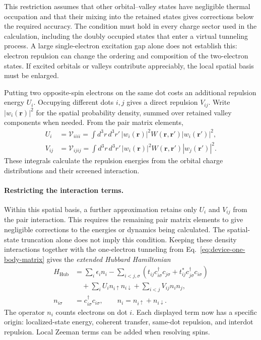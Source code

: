 This restriction assumes that other orbital--valley states have
negligible thermal occupation and that their mixing into the retained
states gives corrections below the required accuracy. The condition
must hold in every charge sector used in the calculation, including
the doubly occupied states that enter a virtual tunneling process.
A large single-electron excitation gap alone does not establish this:
electron repulsion can change the ordering and composition of the
two-electron states. If excited orbitals or valleys contribute
appreciably, the local spatial basis must be enlarged.

Putting two opposite-spin electrons on the same dot costs an
additional repulsion energy $U_i$. Occupying different dots $i,j$
gives a direct repulsion $V_{ij}$. Write $|w_i(\mathbf r)|^2$
for the spatial probability density, summed over retained valley
components when needed. From the pair matrix elements,
\begin{equation}
 \begin{aligned}
 U_i&=\mathcal V_{iiii}
   =\int d^3r\,d^3r'\,
       |w_i(\mathbf r)|^2W(\mathbf r,\mathbf r')
                         |w_i(\mathbf r')|^2,\\
 V_{ij}&=\mathcal V_{ijij}
   =\int d^3r\,d^3r'\,
       |w_i(\mathbf r)|^2W(\mathbf r,\mathbf r')
                         |w_j(\mathbf r')|^2.
 \end{aligned}
 \label{eq:device-density-interactions}
\end{equation}
These integrals calculate the repulsion energies from the
orbital charge distributions and their screened interaction.

\paragraph{Restricting the interaction terms.}
Within this spatial basis, a further approximation retains only
$U_i$ and $V_{ij}$ from the pair interaction. This requires the
remaining pair matrix elements to give negligible corrections to
the energies or dynamics being calculated. The spatial-state
truncation alone does not imply this condition.
Keeping these density interactions together with the one-electron
tunneling from Eq.~\eqref{eq:device-one-body-matrix} gives the
\emph{extended Hubbard Hamiltonian}
\begin{equation}
 \begin{aligned}
 H_{\mathrm{Hub}}
   &=\sum_i\epsilon_i n_i
     -\sum_{i<j,\sigma}
        \left(t_{ij}c_{i\sigma}^\dagger c_{j\sigma}
             +t_{ij}^*c_{j\sigma}^\dagger c_{i\sigma}\right)\\
   &\quad+\sum_i U_i n_{i\uparrow}n_{i\downarrow}
          +\sum_{i<j}V_{ij}n_i n_j,\\
 n_{i\sigma}&=c_{i\sigma}^\dagger c_{i\sigma},
 \qquad n_i=n_{i\uparrow}+n_{i\downarrow}.
 \end{aligned}
 \label{eq:device-extended-hubbard}
\end{equation}
The operator $n_i$ counts electrons on dot $i$.
Each displayed term now has a specific origin: localized-state
energy, coherent transfer, same-dot repulsion, and interdot
repulsion. Local Zeeman terms can be added when resolving spins.

